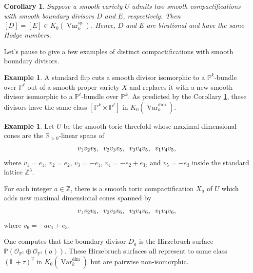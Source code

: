 \documentclass{amsart}
\newtheorem{cor}[thm]{Corollary}
\theoremstyle{definition}
\newtheorem{exmp}[thm]{Example}
\DeclareMathOperator{\Var}{Var}
\DeclareMathOperator{\spr}{sp}
\newcommand{\Kspr}{K_0(\Var_k^{\spr})}
\numberwithin{equation}{section}
\begin{document}
\begin{cor}\label{sm boundary}
Suppose a smooth variety $U$ admits two smooth compactifications with smooth boundary divisors $D$ and $E$, respectively. Then $[D] = [E] \in \Kspr$. Hence, $D$ and $E$ are birational and have the same Hodge numbers.
\end{cor}

Let's pause to give a few examples of distinct compactifications with smooth boundary divisors.

\begin{exmp}
A standard flip cuts a smooth divisor isomorphic to a $\mathbb{P}^k$-bundle over $\mathbb{P}^\ell$ out of a smooth proper variety $X$ and replaces it with a new smooth divisor isomorphic to a $\mathbb{P}^\ell$-bundle over $\mathbb{P}^k$. As predicted by the Corollary \ref{sm boundary}, these divisors have the same class $[\mathbb{P}^k \times \mathbb{P}^\ell]$ in $K_0(\Var_k^{\dim})$.
\end{exmp}

\begin{exmp}
Let $U$ be the smooth toric threefold whose maximal dimensional cones are the $\mathbb{R}_{>0}$-linear spans of
\begin{align*}
    v_1 v_2 v_5, \hspace{.2cm} v_2 v_3 v_5, \hspace{.2cm} v_3 v_4 v_5, \hspace{.2cm} v_1 v_4 v_5, 
\end{align*}
where $v_1=e_1$, $v_2=e_2$, $v_3=-e_1$, $v_4=-e_2+e_3$, and $v_5=-e_3$ inside the standard lattice $\mathbb{Z}^3$.

For each integer $a \in \mathbb{Z}$, there is a smooth toric compactification $X_a$ of $U$ which adds new maximal dimensional cones spanned by
\begin{align*}
    v_1 v_2 v_6, \hspace{.2cm} v_2 v_3 v_6, \hspace{.2cm} v_3 v_4 v_6, \hspace{.2cm} v_1 v_4 v_6, 
\end{align*}
where $v_6 = -ae_1+e_3$.

One computes that the boundary divisor $D_a$ is the Hirzebruch surface $\mathbb{P}(\mathscr{O}_{\mathbb{P}^1} \oplus \mathscr{O}_{\mathbb{P}^1}(a))$. These Hirzebruch surfaces all represent to same class $(\mathbb{L}+\tau)^2$ in $K_0(\Var_k^{\dim})$ but are pairwise non-isomorphic.
\end{exmp}
\end{document}
